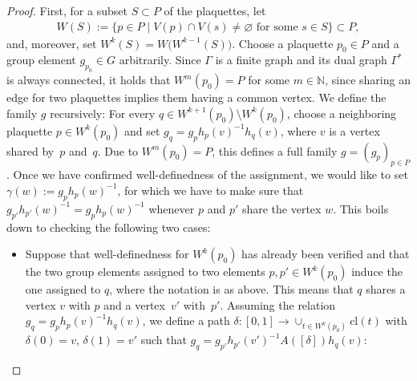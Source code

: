 \documentclass[pdftex]{sigma}
\numberwithin{equation}{section}
\theoremstyle{definition}
\begin{document}
\begin{proof}
First, for a subset $S \subset P$ of the plaquettes, let
\begin{align*}
 W(S) := \{p \in P \mid V(p) \cap V(s) \neq \varnothing \text{ for some }s \in S\} \subset P,
\end{align*}
and, moreover, set $W^k(S) = W\bigl(W^{k-1}(S)\bigr)$. Choose a plaquette $p_0 \in P$ and a group element $g_{p_0} \in G$ arbitrarily. Since $\Gamma$ is a finite graph and its dual graph $\Gamma^*$ is always connected, it holds that $W^m(p_0) = P$ for some $m \in \mathbb{N}$, since sharing an edge for two plaquettes implies them having a common vertex. We define the family $g$ recursively: For every $q \in W^{k+1}(p_0) \setminus W^k(p_0)$, choose a neighboring plaquette $p \in W^k(p_0)$ and set $g_{q} = g_ph_p(v)^{-1}h_{q}(v)$, where $v$ is a vertex shared by~$p$ and~$q$. Due to $W^m(p_0) = P$, this defines a full family $g = (g_p)_{p \in P}$. Once we have confirmed well-definedness of the assignment, we would like to set $\gamma(w) := g_ph_p(w)^{-1}$, for which we have to make sure that $g_{p'}h_{p'}(w)^{-1} = g_ph_p(w)^{-1}$ whenever $p$ and $p'$ share the vertex $w$. This boils down to checking the following two cases:
\begin{itemize}\itemsep=0pt
 \item Suppose that well-definedness for $W^k(p_0)$ has already been verified and that the two group elements assigned to two elements $p, p' \in W^k(p_0)$ induce the one assigned to $q$, where the notation is as above. This means that $q$ shares a vertex $v$ with $p$ and a vertex~$v'$ with~$p'$. Assuming the relation $g_q = g_ph_p(v)^{-1}h_q(v)$, we define a path $\delta\colon [0,1] \rightarrow \cup_{t \in {W^k}(p_0)}\mathrm{cl}(t)$ with $\delta(0) = v$, $\delta(1) = v'$ such that $g_{q} = g_{p'}h_{p'}(v')^{-1}A([\delta])h_{q}(v)$:


\end{itemize}
\end{proof}
\end{document}
